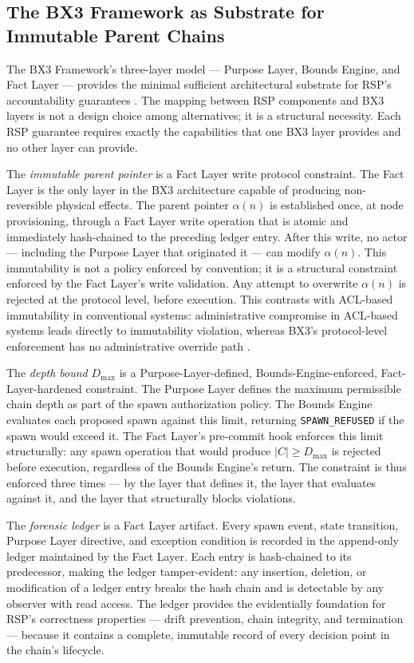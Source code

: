\subsection{The BX3 Framework as Substrate for Immutable Parent Chains}

The BX3 Framework's three-layer model --- Purpose Layer, Bounds Engine, and Fact Layer --- provides the minimal sufficient architectural substrate for RSP's accountability guarantees \cite{bx3framework2026}. The mapping between RSP components and BX3 layers is not a design choice among alternatives; it is a structural necessity. Each RSP guarantee requires exactly the capabilities that one BX3 layer provides and no other layer can provide.

The \emph{immutable parent pointer} is a Fact Layer write protocol constraint. The Fact Layer is the only layer in the BX3 architecture capable of producing non-reversible physical effects. The parent pointer $\alpha(n)$ is established once, at node provisioning, through a Fact Layer write operation that is atomic and immediately hash-chained to the preceding ledger entry. After this write, no actor --- including the Purpose Layer that originated it --- can modify $\alpha(n)$. This immutability is not a policy enforced by convention; it is a structural constraint enforced by the Fact Layer's write validation. Any attempt to overwrite $\alpha(n)$ is rejected at the protocol level, before execution. This contrasts with ACL-based immutability in conventional systems: administrative compromise in ACL-based systems leads directly to immutability violation, whereas BX3's protocol-level enforcement has no administrative override path \cite{bx3framework2026}.

The \emph{depth bound} $D_{\max}$ is a Purpose-Layer-defined, Bounds-Engine-enforced, Fact-Layer-hardened constraint. The Purpose Layer defines the maximum permissible chain depth as part of the spawn authorization policy. The Bounds Engine evaluates each proposed spawn against this limit, returning \texttt{SPAWN\_REFUSED} if the spawn would exceed it. The Fact Layer's pre-commit hook enforces this limit structurally: any spawn operation that would produce $|C| \geq D_{\max}$ is rejected before execution, regardless of the Bounds Engine's return. The constraint is thus enforced three times --- by the layer that defines it, the layer that evaluates against it, and the layer that structurally blocks violations.

The \emph{forensic ledger} is a Fact Layer artifact. Every spawn event, state transition, Purpose Layer directive, and exception condition is recorded in the append-only ledger maintained by the Fact Layer. Each entry is hash-chained to its predecessor, making the ledger tamper-evident: any insertion, deletion, or modification of a ledger entry breaks the hash chain and is detectable by any observer with read access. The ledger provides the evidentially foundation for RSP's correctness properties --- drift prevention, chain integrity, and termination --- because it contains a complete, immutable record of every decision point in the chain's lifecycle.

